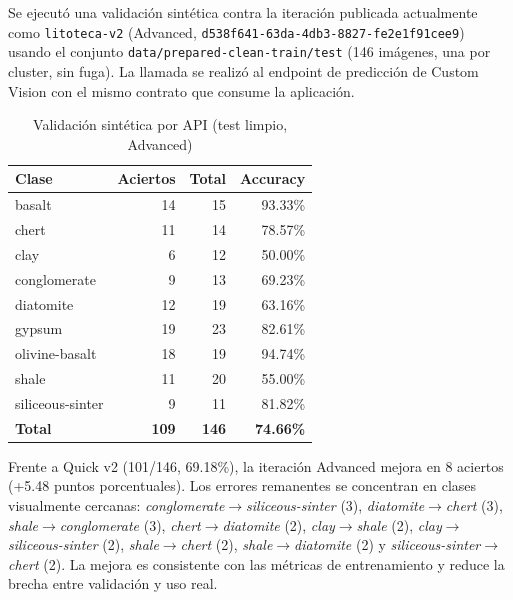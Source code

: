 Se ejecutó una validación sintética contra la iteración publicada actualmente como
\texttt{litoteca-v2} (Advanced, \texttt{d538f641-63da-4db3-8827-fe2e1f91cee9}) usando
el conjunto \texttt{data/prepared-clean-train/test} (146 imágenes, una por cluster,
sin fuga). La llamada se realizó al endpoint de predicción de Custom Vision con el
mismo contrato que consume la aplicación.

\begin{table}[H]
  \centering
  \caption{Validación sintética por API (test limpio, Advanced)}
  \label{tab:api-test}
  \begin{tabular}{@{}lrrr@{}}
    \toprule
    Clase & Aciertos & Total & Accuracy \\
    \midrule
    basalt & 14 & 15 & 93.33\% \\
    chert & 11 & 14 & 78.57\% \\
    clay & 6 & 12 & 50.00\% \\
    conglomerate & 9 & 13 & 69.23\% \\
    diatomite & 12 & 19 & 63.16\% \\
    gypsum & 19 & 23 & 82.61\% \\
    olivine-basalt & 18 & 19 & 94.74\% \\
    shale & 11 & 20 & 55.00\% \\
    siliceous-sinter & 9 & 11 & 81.82\% \\
    \midrule
    \textbf{Total} & \textbf{109} & \textbf{146} & \textbf{74.66\%} \\
    \bottomrule
  \end{tabular}
\end{table}

Frente a Quick v2 (101/146, 69.18\%), la iteración Advanced mejora en 8 aciertos
(+5.48 puntos porcentuales). Los errores remanentes se concentran en clases
visualmente cercanas: \emph{conglomerate}$\rightarrow$\emph{siliceous-sinter} (3),
\emph{diatomite}$\rightarrow$\emph{chert} (3),
\emph{shale}$\rightarrow$\emph{conglomerate} (3),
\emph{chert}$\rightarrow$\emph{diatomite} (2),
\emph{clay}$\rightarrow$\emph{shale} (2),
\emph{clay}$\rightarrow$\emph{siliceous-sinter} (2),
\emph{shale}$\rightarrow$\emph{chert} (2),
\emph{shale}$\rightarrow$\emph{diatomite} (2) y
\emph{siliceous-sinter}$\rightarrow$\emph{chert} (2). La mejora es consistente con
las métricas de entrenamiento y reduce la brecha entre validación y uso real.
